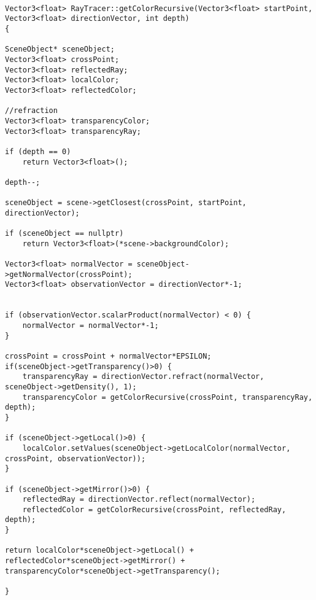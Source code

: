 \begin{lstlisting}

Vector3<float> RayTracer::getColorRecursive(Vector3<float> startPoint, Vector3<float> directionVector, int depth)
{

SceneObject* sceneObject;
Vector3<float> crossPoint;
Vector3<float> reflectedRay;
Vector3<float> localColor;
Vector3<float> reflectedColor;

//refraction
Vector3<float> transparencyColor;
Vector3<float> transparencyRay;

if (depth == 0)
    return Vector3<float>();

depth--;

sceneObject = scene->getClosest(crossPoint, startPoint, directionVector);

if (sceneObject == nullptr)
    return Vector3<float>(*scene->backgroundColor);

Vector3<float> normalVector = sceneObject->getNormalVector(crossPoint);
Vector3<float> observationVector = directionVector*-1;


if (observationVector.scalarProduct(normalVector) < 0) {
    normalVector = normalVector*-1;
}

crossPoint = crossPoint + normalVector*EPSILON;
if(sceneObject->getTransparency()>0) {
    transparencyRay = directionVector.refract(normalVector, sceneObject->getDensity(), 1);
    transparencyColor = getColorRecursive(crossPoint, transparencyRay, depth);
}

if (sceneObject->getLocal()>0) {
    localColor.setValues(sceneObject->getLocalColor(normalVector, crossPoint, observationVector));
}

if (sceneObject->getMirror()>0) {
    reflectedRay = directionVector.reflect(normalVector);
    reflectedColor = getColorRecursive(crossPoint, reflectedRay, depth);
}

return localColor*sceneObject->getLocal() + reflectedColor*sceneObject->getMirror() + transparencyColor*sceneObject->getTransparency();

}

\end{lstlisting}
	
